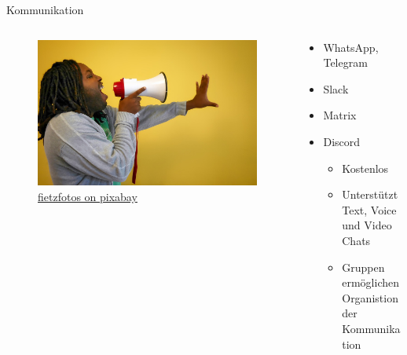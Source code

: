 \begin{frame}{Kommunikation}
    \begin{columns}[t]
        \begin{column}{0.4\textwidth}
            \vspace{-2em} 
            \begin{figure}
                \begin{flushleft}
                    \includegraphics[height=0.8\textheight,trim={4cm 0 17cm 0},clip]{graphics/call-2946023_1280.jpg}
                    \caption*{\href{https://pixabay.com/photos/call-afro-megaphone-scream-symbol-2946023/}{fietzfotos on pixabay}}    
                \end{flushleft}                
            \end{figure}            
        \end{column}
        \begin{column}{0.6\textwidth}
            \begin{itemize}
                \item WhatsApp, Telegram
                \item Slack
                \item Matrix        
                \item Discord
                \begin{itemize}
                    \item Kostenlos
                    \item Unterstützt Text, Voice und Video Chats
                    \item Gruppen ermöglichen Organistion der Kommunikation
                \end{itemize}    
            \end{itemize}
        \end{column}
    \end{columns}
\end{frame}

